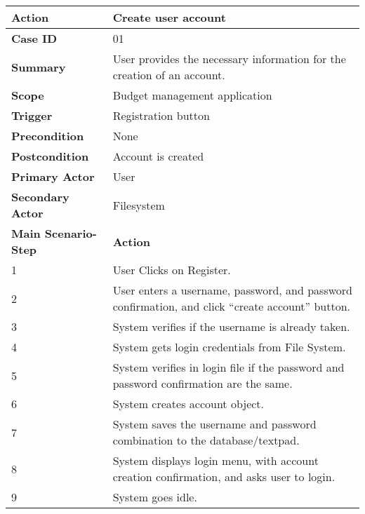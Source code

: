 \documentclass[letterpaper]{article}
\begin{document}
        \begin{center}
        \begin{tabular}{ | m{5cm} | m{10cm}| } 
            \hline
            \textbf{Action} & Create user account \\ 
            \hline
            \textbf{Case ID} & 01 \\ 
            \hline
            \textbf{Summary} & User provides the necessary information for the creation of an account. \\
            \hline
            \textbf{Scope} & Budget management application \\ 
            \hline
            \textbf{Trigger} & Registration button \\
            \hline
            \textbf{Precondition} & None \\ 
            \hline
            \textbf{Postcondition} & Account is created \\ 
            \hline
            \textbf{Primary Actor} & User \\ 
            \hline
            \textbf{Secondary Actor} & Filesystem \\ 
            \hline
            \textbf{Main Scenario-Step} & \textbf{Action} \\ 
            \hline
            1 & User Clicks on Register. \\ 
            \hline
            2 & User enters a username, password, and password confirmation, and click “create account” button. \\ 
            \hline
            3 & System verifies if the username is already taken. \\ 
            \hline
            4 & System gets login credentials from File System. \\ 
            \hline
            5 & System verifies in login file if the password and password confirmation are the same. \\ 
            \hline
            6 & System creates account object. \\ 
            \hline
            7 & System saves the username and password combination to the database/textpad. \\
            \hline
            8 & System displays login menu, with account creation confirmation, and asks user to login. \\ 
            \hline
            9 & System goes idle. \\ 
            \hline
        \end{tabular}
        \end{center}
\end{document}
